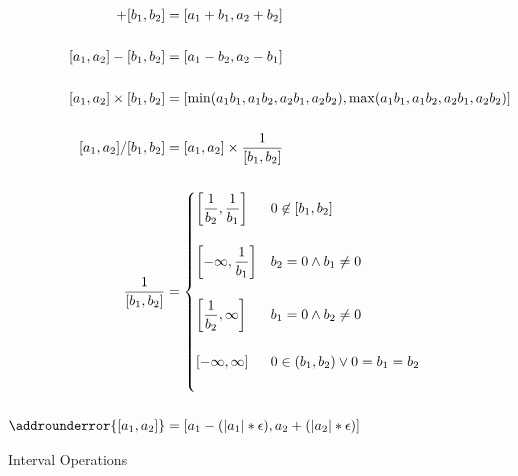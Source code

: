 \begin{figure*}
  \footnotesize
  \begin{align*}
    [a_1, a_2] + [b_1, b_2] & = [a_1+b_1, a_2+b_2] \\\\
    [a_1, a_2] - [b_1, b_2] & = [a_1-b_2, a_2-b_1] \\\\
    [a_1, a_2] \times [b_1, b_2] & = [\min(a_1b_1, a_1b_2, a_2b_1, a_2b_2), \max(a_1b_1, a_1b_2, a_2b_1, a_2b_2)] \\\\
    [a_1, a_2] / [b_1, b_2] & = [a_1, a_2] \times \dfrac{1}{[b_1, b_2]} \\\\
    \dfrac{1}{[b_1, b_2]} & =
    \begin{cases}
      \left[\dfrac{1}{b_2}, \dfrac{1}{b_1}\right] & 0\not\in[b_1, b_2] \\\\
      \left[-\infty, \dfrac{1}{b_1}\right] & b_2 = 0 \wedge b_1\ne0 \\\\
      \left[\dfrac{1}{b_2}, \infty\right] & b_1 = 0 \wedge b_2\ne0 \\\\
      \left[-\infty, \infty\right] & 0\in(b_1, b_2) \vee 0=b_1=b_2 \\\\
    \end{cases} \\\\
    \addrounderror{[a_1, a_2]} & = [a_1 - (|a_1|*\epsilon), a_2 + (|a_2|*\epsilon)]
  \end{align*}
  \caption{Interval Operations}
  \label{fig:interval_operations_acc}
\end{figure*}

